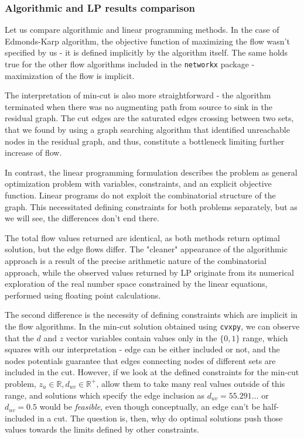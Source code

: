 \documentclass[12pt, openany]{article}
\begin{document}
\subsubsection{Algorithmic and LP results comparison}

Let us compare algorithmic and linear programming methods. In the case of Edmonds-Karp algorithm, the objective function of maximizing the flow wasn't specified by us - it is defined implicitly by the algorithm itself. The same holds true for the other flow algorithms included in the \texttt{networkx} package - maximization of the flow is implicit.

The interpretation of min-cut is also more straightforward - the algorithm terminated when there was no augmenting path from source to sink in the residual graph. The cut edges are the saturated edges crossing between two sets, that we found by using a graph searching algorithm that identified unreachable nodes in the residual graph, and thus, constitute a bottleneck limiting further increase of flow.

In contrast, the linear programming formulation describes the problem as general optimization problem with variables, constraints, and an explicit objective function. Linear programs do not exploit the combinatorial structure of the graph. This necessitated defining constraints for both problems separately, but as we will see, the differences don't end there.

The total flow values returned are identical, as both methods return optimal solution, but the edge flows differ. The "cleaner" appearance of the algorithmic approach is a result of the precise arithmetic nature of the combinatorial approach, while the observed values returned by LP originate from its numerical exploration of the real number space constrained by the linear equations, performed using floating point calculations.

The second difference is the necessity of defining constraints which are implicit in the flow algorithms. In the min-cut solution obtained using \texttt{cvxpy}, we can observe that the \(d\) and \(z\) vector variables contain values only in the \(\{0, 1\}\) range, which squares with our interpretation - edge can be either included or not, and the nodes potentials guarantee that edges connecting nodes of different sets are included in the cut. However, if we look at the defined constraints for the min-cut problem, \(z_u \in \mathbb{R}, d_{uv} \in \mathbb{R^+}\), allow them to take many real values outside of this range, and solutions which specify the edge inclusion as \(d_{uv} = 55.291...\) or \(d_{uv} = 0.5\) would be \textit{feasible}, even though conceptually, an edge can't be half-included in a cut. The question is, then, why do optimal solutions push those values towards the limits defined by other constraints.
\end{document}
